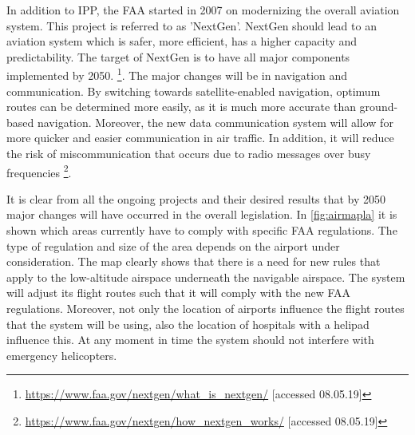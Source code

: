 In addition to IPP, the FAA started in 2007 on modernizing the overall aviation system. This project is referred to as 'NextGen'. NextGen should lead to an aviation system which is safer, more efficient, has a higher capacity and predictability. The target of NextGen is to have all major components implemented by 2050. \footnote{\url{https://www.faa.gov/nextgen/what_is_nextgen/} [accessed 08.05.19]}. The major changes will be in navigation and communication. By switching towards satellite-enabled navigation, optimum routes can be determined more easily, as it is much more accurate than ground-based navigation. Moreover, the new data communication system will allow for more quicker and easier communication in air traffic. In addition, it will reduce the risk of miscommunication that occurs due to radio messages over busy frequencies \footnote{\url{https://www.faa.gov/nextgen/how_nextgen_works/} [accessed 08.05.19]}.

It is clear from all the ongoing projects and their desired results that by 2050 major changes will have occurred in the overall legislation. In \autoref{fig:airmapla} it is shown which areas currently have to comply with specific FAA regulations. The type of regulation and size of the area depends on the airport under consideration. The map clearly shows that there is a need for new rules that apply to the low-altitude airspace underneath the navigable airspace. The system will adjust its flight routes such that it will comply with the new FAA regulations. Moreover, not only the location of airports influence the flight routes that the system will be using, also the location of hospitals with a helipad influence this. At any moment in time the system should not interfere with emergency helicopters. 

